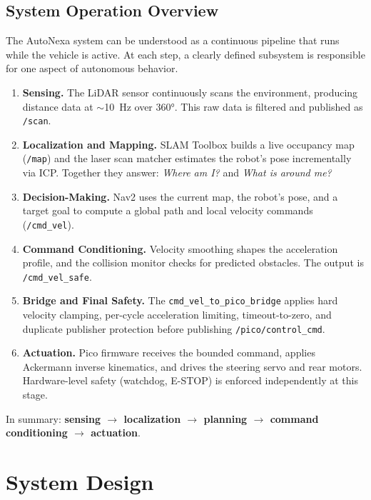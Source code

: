 \documentclass[12pt,a4paper]{report}
\newcommand{\pname}{AutoNexa}
\begin{document}
\section{System Operation Overview}

The \pname{} system can be understood as a continuous pipeline that runs while the vehicle is active. At each step, a clearly defined subsystem is responsible for one aspect of autonomous behavior.

\begin{enumerate}[label=\textbf{Step \arabic*:}, leftmargin=2.5cm]
    \item \textbf{Sensing.} The LiDAR sensor continuously scans the environment, producing distance data at $\sim$10~Hz over 360°. This raw data is filtered and published as \texttt{/scan}.
    \item \textbf{Localization and Mapping.} SLAM Toolbox builds a live occupancy map (\texttt{/map}) and the laser scan matcher estimates the robot's pose incrementally via ICP. Together they answer: \textit{Where am I?} and \textit{What is around me?}
    \item \textbf{Decision-Making.} Nav2 uses the current map, the robot's pose, and a target goal to compute a global path and local velocity commands (\texttt{/cmd\_vel}).
    \item \textbf{Command Conditioning.} Velocity smoothing shapes the acceleration profile, and the collision monitor checks for predicted obstacles. The output is \texttt{/cmd\_vel\_safe}.
    \item \textbf{Bridge and Final Safety.} The \texttt{cmd\_vel\_to\_pico\_bridge} applies hard velocity clamping, per-cycle acceleration limiting, timeout-to-zero, and duplicate publisher protection before publishing \texttt{/pico/control\_cmd}.
    \item \textbf{Actuation.} Pico firmware receives the bounded command, applies Ackermann inverse kinematics, and drives the steering servo and rear motors. Hardware-level safety (watchdog, E-STOP) is enforced independently at this stage.
\end{enumerate}

\noindent In summary: \textbf{sensing $\rightarrow$ localization $\rightarrow$ planning $\rightarrow$ command conditioning $\rightarrow$ actuation}.

\chapter{System Design}
\end{document}
